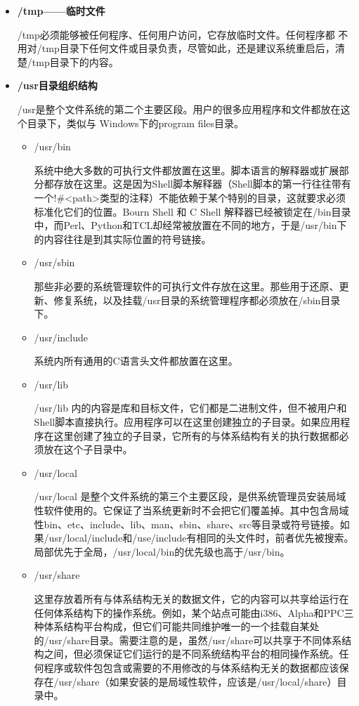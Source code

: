 \begin{itemize}
\item \textbf{/tmp——临时文件}

\qquad /tmp必须能够被任何程序、任何用户访问，它存放临时文件。任何程序都 不用对/tmp目录下任何文件或目录负责，尽管如此，还是建议系统重启后，清楚/tmp目录下的内容。

\item \textbf{/usr目录组织结构}

\qquad /usr是整个文件系统的第二个主要区段。用户的很多应用程序和文件都放在这个目录下，类似与
Windows下的program files目录。
	\begin{itemize}
	\item /usr/bin
	
	\qquad 系统中绝大多数的可执行文件都放置在这里。脚本语言的解释器或扩展部分都存放在这里。这是因为Shell脚本解释器（Shell脚本的第一行往往带有一个!\#<path>类型的注释）不能依赖于某个特别的目录，这就要求必须标准化它们的位置。Bourn Shell 和 C Shell 解释器已经被锁定在/bin目录中，而Perl、Python和TCL却经常被放置在不同的地方，于是/usr/bin下的内容往往是到其实际位置的符号链接。
	
	\item /usr/sbin
	
	\qquad 那些非必要的系统管理软件的可执行文件存放在这里。那些用于还原、更新、修复系统，以及挂载/usr目录的系统管理程序都必须放在/sbin目录下。
	
	\item /usr/include
	
	\qquad 系统内所有通用的C语言头文件都放置在这里。
	
	\item /usr/lib
	
	\qquad /usr/lib 内的内容是库和目标文件，它们都是二进制文件，但不被用户和Shell脚本直接执行。应用程序可以在这里创建独立的子目录。如果应用程序在这里创建了独立的子目录，它所有的与体系结构有关的执行数据都必须放在这个子目录中。
	
	\item /usr/local
	
	\qquad /usr/local 是整个文件系统的第三个主要区段，是供系统管理员安装局域性软件使用的。它保证了当系统更新时不会把它们覆盖掉。其中包含局域性bin、etc、include、lib、man、sbin、share、src等目录或符号链接。如果/usr/local/include和/use/include有相同的头文件时，前者优先被搜索。局部优先于全局，/usr/local/bin的优先级也高于/usr/bin。
	
	\item /usr/share
	
	\qquad 这里存放着所有与体系结构无关的数据文件，它的内容可以共享给运行在任何体系结构下的操作系统。例如，某个站点可能由i386、Alpha和PPC三种体系结构平台构成，但它们可能共同维护唯一的一个挂载自某处的/usr/share目录。需要注意的是，虽然/usr/share可以共享于不同体系结构之间，但必须保证它们运行的是不同系统结构平台的相同操作系统。任何程序或软件包包含或需要的不用修改的与体系结构无关的数据都应该保存在/usr/share（如果安装的是局域性软件，应该是/usr/local/share）目录中。
	

\end{itemize}
\end{itemize}

